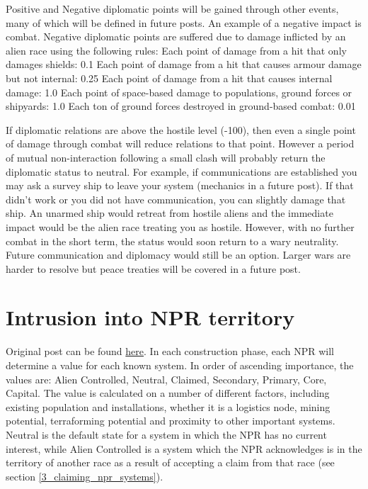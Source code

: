 \documentclass[10pt,a4paper,oneside]{article}
\begin{document}
Positive and Negative diplomatic points will be gained through other events, many of which will be defined in future posts. An example of a negative impact is combat. Negative diplomatic points are suffered due to damage inflicted by an alien race using the following rules:\newline
Each point of damage from a hit that only damages shields: 0.1\newline
Each point of damage from a hit that causes armour damage but not internal: 0.25\newline
Each point of damage from a hit that causes internal damage: 1.0\newline
Each point of space-based damage to populations, ground forces or shipyards: 1.0\newline
Each ton of ground forces destroyed in ground-based combat: 0.01\newline

If diplomatic relations are above the hostile level (-100), then even a single point of damage through combat will reduce relations to that point. However a period of mutual non-interaction following a small clash will probably return the diplomatic status to neutral. For example, if communications are established you may ask a survey ship to leave your system (mechanics in a future post). If that didn't work or you did not have communication, you can slightly damage that ship. An unarmed ship would retreat from hostile aliens and the immediate impact would be the alien race treating you as hostile. However, with no further combat in the short term, the status would soon return to a wary neutrality. Future communication and diplomacy would still be an option. Larger wars are harder to resolve but peace treaties will be covered in a future post.

\section{Intrusion into NPR territory}\label{2_intrusion_into_npr}
Original post can be found
\href{http://aurora2.pentarch.org/index.php?topic=8495.msg118318#msg118318}{here}.
\newline\newline
In each construction phase, each NPR will determine a value for each known system. In order of ascending importance, the values are: Alien Controlled, Neutral, Claimed, Secondary, Primary, Core, Capital. The value is calculated on a number of different factors, including existing population and installations, whether it is a logistics node, mining potential, terraforming potential and proximity to other important systems. Neutral is the default state for a system in which the NPR has no current interest, while Alien Controlled is a system which the NPR acknowledges is in the territory of another race as a result of accepting a claim from that race (see section \ref{3_claiming_npr_systems}).
\end{document}
